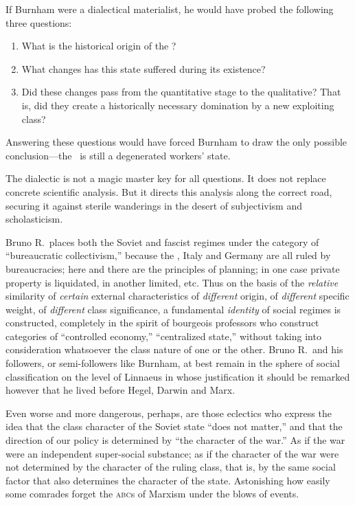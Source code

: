If Burnham were a dialectical materialist, he would have probed the following three questions:
\begin{enumerate}
  \item What is the historical origin of the \USSR?
  \item What changes has this state suffered during its existence?
  \item Did these changes pass from the quantitative stage to the qualitative? That is, did they create a historically necessary domination by a new exploiting class? \nowidow
\end{enumerate}
Answering these questions would have forced Burnham to draw the only possible conclusion---the \USSR\ is still a degenerated workers’ state.

The dialectic is not a magic master key for all questions. It does not replace concrete scientific analysis. But it directs this analysis along the correct road, securing it against sterile wanderings in the desert of subjectivism and scholasticism.

Bruno R.\ places both the Soviet and fascist regimes under the category of “bureaucratic collectivism,” because the \USSR, Italy and Germany are all ruled by bureaucracies; here and there are the principles of planning; in one case private property is liquidated, in another limited, etc. Thus on the basis of the \emph{relative} similarity of \emph{certain} external characteristics of \emph{different} origin, of \emph{different} specific weight, of \emph{different} class significance, a fundamental \emph{identity} of social regimes is constructed, completely in the spirit of bourgeois professors who construct categories of “controlled economy,” “centralized state,” without taking into consideration whatsoever the class nature of one or the other. Bruno R.\ and his followers, or semi-followers like Burnham, at best remain in the sphere of social classification on the level of Linnaeus in whose justification it should be remarked however that he lived before Hegel, Darwin and Marx.

Even worse and more dangerous, perhaps, are those eclectics who express the idea that the class character of the Soviet state “does not matter,” and that the direction of our policy is determined by “the character of the war.” As if the war were an independent super-social substance; as if the character of the war were not determined by the character of the ruling class, that is, by the same social factor that also determines the character of the state. Astonishing how easily some comrades forget the \textsc{abc}s of Marxism under the blows of events.

